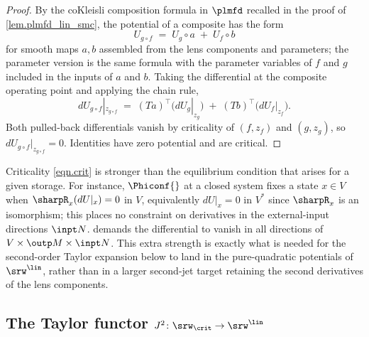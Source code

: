 \begin{proof}
By the coKleisli composition formula in $\plmfd$ recalled in the proof of \cref{lem.plmfd_lin_smc}, the potential of a composite has the form
\[
U_{g\circ f}\;=\;U_g\circ a\;+\;U_f\circ b
\]
for smooth maps $a,b$ assembled from the lens components and parameters; the parameter version is the same formula with the parameter variables of $f$ and $g$ included in the inputs of $a$ and $b$. Taking the differential at the composite operating point and applying the chain rule,
\[
dU_{g\circ f}|_{z_{g\circ f}}\;=\;(Ta)^\top\bigl(dU_g|_{z_g}\bigr)\;+\;(Tb)^\top\bigl(dU_f|_{z_f}\bigr).
\]
Both pulled-back differentials vanish by criticality of $(f,z_f)$ and $(g,z_g)$, so $dU_{g\circ f}|_{z_{g\circ f}}=0$. Identities have zero potential and are critical.\qedhere
\end{proof}

\begin{remark}\label{rmk.full_vs_storage_critical}
Criticality \eqref{eqn.crit} is stronger than the equilibrium condition that arises for a given storage. For instance, $\Phiconf{}$ at a closed system fixes a state $x\in V$ when $\sharpR_x(dU|_x)=0$ in $V$, equivalently $dU|_x=0$ in $V^*$ since $\sharpR_x$ is an isomorphism; this places no constraint on derivatives in the external-input directions $\inpt N$.  demands the differential to vanish in all directions of $V\times\outp M\times\inpt N$. This extra strength is exactly what is needed for the second-order Taylor expansion below to land in the pure-quadratic potentials of $\srw^{\lin}$, rather than in a larger second-jet target retaining the second derivatives of the lens components.\qedhere
\end{remark}

\subsection{The Taylor functor \texorpdfstring{$J^2\colon\srw_{\crit}\to\srw^{\lin}$}{J2: SRW\_crit -> SRW\_lin}}\label{sec.taylor_critical}

